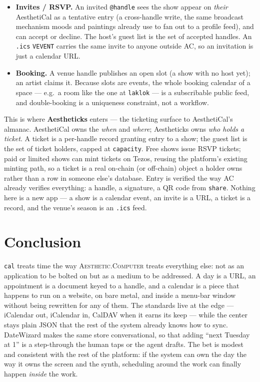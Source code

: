 \documentclass[10pt,letterpaper,twocolumn]{article}
\newcommand{\ac}{\textsc{Aesthetic.Computer}}
\begin{document}
\begin{itemize}
  \item \textbf{Invites / RSVP.} An invited \texttt{@handle} sees the show appear on \emph{their} AesthetiCal as a tentative entry (a cross-handle write, the same broadcast mechanism moods and paintings already use to fan out to a profile feed), and can accept or decline. The host's guest list is the set of accepted handles. An \texttt{.ics} \texttt{VEVENT} carries the same invite to anyone outside AC, so an invitation is just a calendar URL.
  \item \textbf{Booking.} A venue handle publishes an open slot (a show with no host yet); an artist claims it. Because slots are events, the whole booking calendar of a space --- e.g.\ a room like the one at \texttt{laklok} --- is a subscribable public feed, and double-booking is a uniqueness constraint, not a workflow.
\end{itemize}

This is where \textbf{Aestheticks} enters --- the ticketing surface to AesthetiCal's almanac. AesthetiCal owns the \emph{when} and \emph{where}; Aestheticks owns \emph{who holds a ticket}. A ticket is a per-handle record granting entry to a show; the guest list is the set of ticket holders, capped at \texttt{capacity}. Free shows issue RSVP tickets; paid or limited shows can mint tickets on Tezos, reusing the platform's existing minting path, so a ticket is a real on-chain (or off-chain) object a holder owns rather than a row in someone else's database. Entry is verified the way AC already verifies everything: a handle, a signature, a QR code from \texttt{share}. Nothing here is a new app --- a show is a calendar event, an invite is a URL, a ticket is a record, and the venue's season is an \texttt{.ics} feed.

\section{Conclusion}

\texttt{cal} treats time the way \ac{} treats everything else: not as an application to be bolted on but as a medium to be addressed. A day is a URL, an appointment is a document keyed to a handle, and a calendar is a piece that happens to run on a website, on bare metal, and inside a menu-bar window without being rewritten for any of them. The standards live at the edge --- iCalendar out, iCalendar in, CalDAV when it earns its keep --- while the center stays plain JSON that the rest of the system already knows how to sync. DateWizard makes the same store conversational, so that adding ``next Tuesday at 1'' is a step-through the human taps or the agent drafts. The bet is modest and consistent with the rest of the platform: if the system can own the day the way it owns the screen and the synth, scheduling around the work can finally happen \emph{inside} the work.



\end{document}
